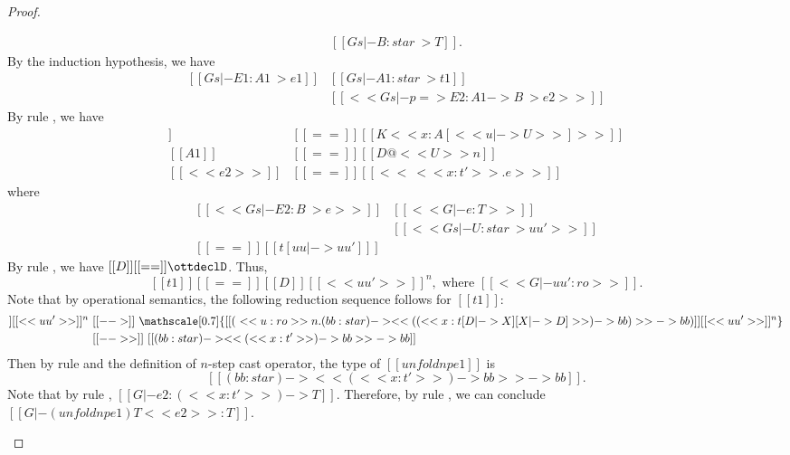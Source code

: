 \begin{proof}
\begin{description}
\[\begin{array}{l}
                [[Gs |- B : star ~> T]].
            \end{array}\]
            By the induction hypothesis, we have 
            \[\begin{array}{ll}
                [[Gs |- E1 : A1 ~> e1]] &
                [[Gs |- A1 : star ~> t1]] \\
                [[G |- e1 : t1]] &
                [[<< Gs |- p => E2 : A1 -> B ~> e2 >>]]            
            \end{array}\]
            By rule , we have
            \begin{align*}
                [[p]] &[[==]] [[K <<x:A[<< u |-> U >>]>>]] \\
                [[A1]] &[[==]] [[D@<<U>>n]] \\
                [[<<e2>>]] &[[==]] [[<<\ <<x:t'>> .e>>]]
            \end{align*}
            where
            \[\begin{array}{ll}
                [[<<Gs |- E2 : B ~> e>>]] &
                [[<<G |- e : T>>]] \\
                [[<<Gs |- A[<< u |-> U >>]:star ~> t[uu |-> uu']>>]] &
                [[<<Gs |- U : star ~> uu'>>]] \\
                [[t']] [[==]] [[ t[uu |-> uu'] ]]
            \end{array}\]
            By rule , we have $[[D]]  [[ == ]] \ottdeclD$. Thus,
            \[ [[t1]] [[==]] [[D]] [[<<uu'>>]]^n,\text{ where }[[<<G |- uu' : ro>>]].\] 
            Note that by operational semantics, the following reduction sequence follows for $[[t1]]$:
            \begin{align*}
                [[D]] [[<<uu'>>]]^n~
                &[[-->]]~ \mathscale[0.7]{[[(\ <<u:ro>>n . (bb:star) -> << ((<<x : t[D |-> X][X |-> D]>>) -> bb) >> -> bb) ]][[<<uu'>>]]^n}\\
                &[[-->>]]~ [[(bb:star) -> << (<<x:t'>>) -> bb >> -> bb]]
            \end{align*}
            Then by
            rule  and the definition of $n$-step cast operator, the
            type of $[[unfoldnp e1]]$ is \[ [[(bb:star) -> << (<<x:t'>>) -> bb >> -> bb]].\] Note
            that by rule , $[[G |- e2 : (<<x:t'>>) -> T]]$. Therefore, by rule
            , we can conclude $[[G |- (unfoldnp e1) T <<e2>> : T]]$.
    \end{description}
\end{proof}

